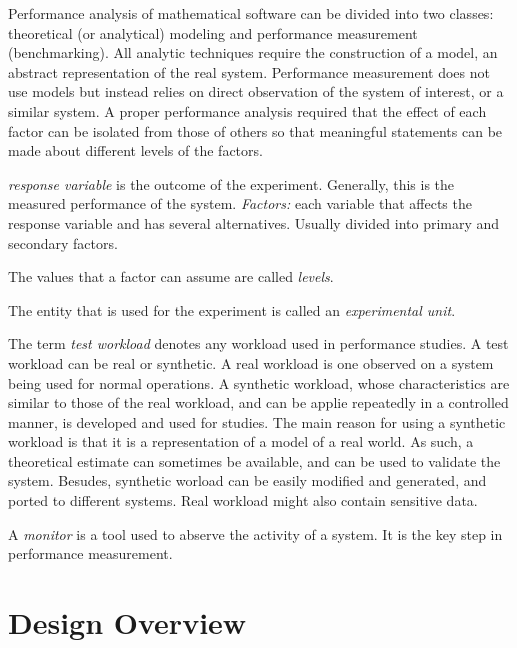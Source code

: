 \documentclass[11pt,relax]{SANDreport}
\begin{document}
Performance analysis of mathematical software can be divided into two classes:
theoretical (or analytical) modeling and performance measurement (benchmarking).
All analytic techniques require the
construction of a model, an abstract representation of the real system. 
Performance measurement does not
use models but instead relies on direct observation of the system of interest,
or a similar system.
A proper performance analysis required that the effect of each factor can be
isolated from those of others so that meaningful statements can be made about
different levels of the factors.

{\sl response variable} is the outcome of the experiment. Generally, this is
the measured performance of the system. 
{\sl Factors:} each variable that affects the response variable and has
several alternatives. Usually divided into primary and secondary factors.

The values that a factor can assume are called {\sl levels}. 

The entity that is used for the experiment is called an {\sl experimental
  unit}.

\smallskip

The term {\sl test workload} denotes any workload used in performance studies.
A test workload can be real or synthetic. A real workload is one observed on a
system being used for normal operations. A synthetic workload, whose
characteristics are similar to those of the real workload, and can be applie
repeatedly in a controlled manner, is developed and used for studies. The main
reason for using a synthetic workload is that it is a representation of a
model of a real world. As such, a theoretical estimate can sometimes be
available, and can be used to validate the system. Besudes, synthetic worload
can be easily modified and generated, and ported to different systems. Real
workload might also contain sensitive data.

A {\sl monitor} is a tool used to abserve the activity of a system. It is the key
step in performance measurement. 

\section{Design Overview}

\end{document}
